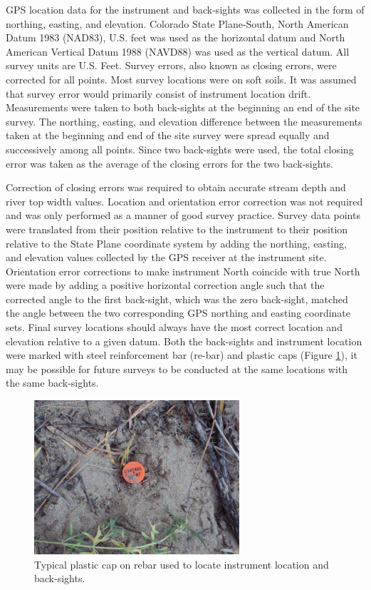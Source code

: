 GPS location data for the instrument and back-sights was collected in the form of northing, easting, and elevation.  Colorado State Plane-South, North American Datum 1983 (NAD83), U.S. feet was used as the horizontal datum and North American Vertical Datum 1988 (NAVD88) was used as the vertical datum.  All survey units are U.S. Feet.  Survey errors, also known as closing errors, were corrected for all points.  Most survey locations were on soft soils.  It was assumed that survey error would primarily consist of instrument location drift.  Measurements were taken to both back-sights at the beginning an end of the site survey.  The northing, easting, and elevation difference between the measurements taken at the beginning and end of the site survey were spread equally and successively among all points.  Since two back-sights were used, the total closing error was taken as the average of the closing errors for the two back-sights.  

Correction of closing errors was required to obtain accurate stream depth and river top width values.  Location and orientation error correction was not required and was only performed as a manner of good survey practice.  Survey data points were translated from their position relative to the instrument to their position relative to the State Plane coordinate system by adding the northing, easting, and elevation values collected by the GPS receiver at the instrument site.  Orientation error corrections to make instrument North coincide with true North were made by adding a positive horizontal correction angle such that the corrected angle to the first back-sight, which was the zero back-sight, matched the angle between the two corresponding GPS northing and easting coordinate sets.  Final survey locations should always have the most correct location and elevation relative to a given datum.  Both the back-sights and instrument location were marked with steel reinforcement bar (re-bar) and plastic caps (Figure \ref{pic:plasticCap}), it may be possible for future surveys to be conducted at the same locations with the same back-sights.

\begin{figure}[htbp]
\centering
	\includegraphics[width=3in]{Figures/Photo/ControlPoint}
	\caption[Typical plastic cap on rebar used to locate instrument location and back-sights.]{Typical plastic cap on rebar used to locate instrument location and back-sights.}
	\label{pic:plasticCap}
\end{figure}

